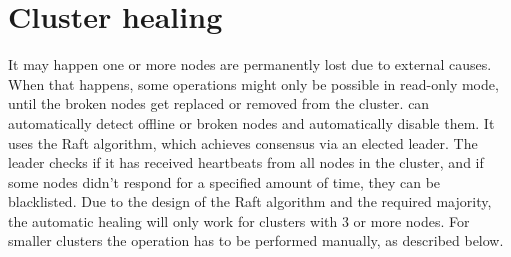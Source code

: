 \section{Cluster healing}
It may happen one or more nodes are permanently lost due to external causes.
When that happens, some operations might only be possible in read-only mode,
until the broken nodes get replaced or removed from the cluster.
\SX can automatically detect offline or broken nodes and automatically disable
them. It uses the Raft algorithm, which achieves consensus via an elected leader.
The leader checks if it has received heartbeats from all nodes in the cluster, and
if some nodes didn't respond for a specified amount of time, they can be
blacklisted. Due to the design of the Raft algorithm and the required majority,
the automatic healing will only work for clusters with 3 or more nodes. For
smaller clusters the operation has to be performed manually, as described below.

